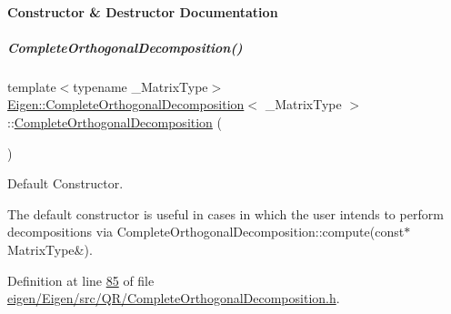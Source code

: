 \paragraph{Constructor \& Destructor Documentation}
\mbox{\label{group___q_r___module_a7ba33814fd3fdc62f6179cdcd655c679}} 
\subparagraph{\texorpdfstring{Complete\+Orthogonal\+Decomposition()}{CompleteOrthogonalDecomposition()}\hspace{0.1cm}{\footnotesize\ttfamily [1/8]}}
{\footnotesize\ttfamily template$<$typename \+\_\+\+Matrix\+Type$>$ \\
\hyperlink{group___q_r___module_class_eigen_1_1_complete_orthogonal_decomposition}{Eigen\+::\+Complete\+Orthogonal\+Decomposition}$<$ \+\_\+\+Matrix\+Type $>$\+::\hyperlink{group___q_r___module_class_eigen_1_1_complete_orthogonal_decomposition}{Complete\+Orthogonal\+Decomposition} (\begin{DoxyParamCaption}{ }\end{DoxyParamCaption})\hspace{0.3cm}{\ttfamily [inline]}}



Default Constructor. 

The default constructor is useful in cases in which the user intends to perform decompositions via {\ttfamily Complete\+Orthogonal\+Decomposition\+::compute(const$\ast$ Matrix\+Type\&)}. 

Definition at line \hyperlink{eigen_2_eigen_2src_2_q_r_2_complete_orthogonal_decomposition_8h_source_l00085}{85} of file \hyperlink{eigen_2_eigen_2src_2_q_r_2_complete_orthogonal_decomposition_8h_source}{eigen/\+Eigen/src/\+Q\+R/\+Complete\+Orthogonal\+Decomposition.\+h}.

